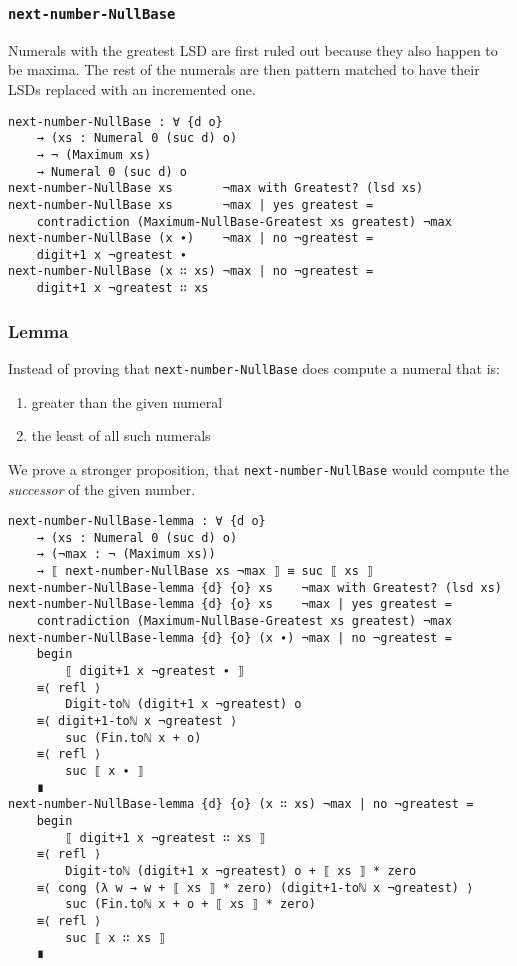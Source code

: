 \documentclass[\main/thesis.tex]{subfiles}
\begin{document}
\subsubsection{{\lstinline|next-number-NullBase|}}

Numerals with the greatest LSD are first ruled out because they also happen
to be maxima. The rest of the numerals are then pattern matched to have their
LSDs replaced with an incremented one.

\begin{lstlisting}
next-number-NullBase : ∀ {d o}
    → (xs : Numeral 0 (suc d) o)
    → ¬ (Maximum xs)
    → Numeral 0 (suc d) o
next-number-NullBase xs       ¬max with Greatest? (lsd xs)
next-number-NullBase xs       ¬max | yes greatest =
    contradiction (Maximum-NullBase-Greatest xs greatest) ¬max
next-number-NullBase (x ∙)    ¬max | no ¬greatest =
    digit+1 x ¬greatest ∙
next-number-NullBase (x ∷ xs) ¬max | no ¬greatest =
    digit+1 x ¬greatest ∷ xs
\end{lstlisting}

\subsubsection{Lemma}

Instead of proving that {\lstinline|next-number-NullBase|} does compute a numeral
that is:
\begin{enumerate}
    \item greater than the given numeral
    \item the least of all such numerals
\end{enumerate}

We prove a stronger proposition, that {\lstinline|next-number-NullBase|} would
compute the \textit{successor} of the given number.

\begin{lstlisting}[basicstyle=\ttfamily\scriptsize]
next-number-NullBase-lemma : ∀ {d o}
    → (xs : Numeral 0 (suc d) o)
    → (¬max : ¬ (Maximum xs))
    → ⟦ next-number-NullBase xs ¬max ⟧ ≡ suc ⟦ xs ⟧
next-number-NullBase-lemma {d} {o} xs    ¬max with Greatest? (lsd xs)
next-number-NullBase-lemma {d} {o} xs    ¬max | yes greatest =
    contradiction (Maximum-NullBase-Greatest xs greatest) ¬max
next-number-NullBase-lemma {d} {o} (x ∙) ¬max | no ¬greatest =
    begin
        ⟦ digit+1 x ¬greatest ∙ ⟧
    ≡⟨ refl ⟩
        Digit-toℕ (digit+1 x ¬greatest) o
    ≡⟨ digit+1-toℕ x ¬greatest ⟩
        suc (Fin.toℕ x + o)
    ≡⟨ refl ⟩
        suc ⟦ x ∙ ⟧
    ∎
next-number-NullBase-lemma {d} {o} (x ∷ xs) ¬max | no ¬greatest =
    begin
        ⟦ digit+1 x ¬greatest ∷ xs ⟧
    ≡⟨ refl ⟩
        Digit-toℕ (digit+1 x ¬greatest) o + ⟦ xs ⟧ * zero
    ≡⟨ cong (λ w → w + ⟦ xs ⟧ * zero) (digit+1-toℕ x ¬greatest) ⟩
        suc (Fin.toℕ x + o + ⟦ xs ⟧ * zero)
    ≡⟨ refl ⟩
        suc ⟦ x ∷ xs ⟧
    ∎
\end{lstlisting}
\end{document}
